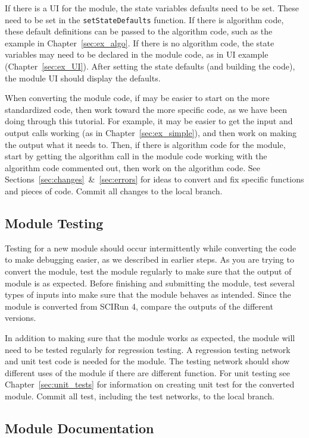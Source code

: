 \documentclass[fleqn,11pt,openany]{book}
\begin{document}
If there is a UI for the module, the state variables defaults need to be set.  
These need to be set in the \verb|setStateDefaults| function.
If there is algorithm code, these default definitions can be passed to the algorithm code, such as the example in Chapter~\ref{sec:ex_algo}.
If there is no algorithm code, the state variables may need to be declared in the module code, as in UI example (Chapter~\ref{sec:ex_UI}).
After setting the state defaults (and building the code), the module UI should display the defaults.

When converting the module code, if may be easier to start on the more standardized code, then work toward the more specific code, as we have been doing through this tutorial.  
For example, it may be easier to get the input and output calls working (as in Chapter~\ref{sec:ex_simple}), and then work on making the output what it needs to.  
Then, if there is algorithm code for the module, start by getting the algorithm call in the module code working with the algorithm code commented out, then work on the algorithm code.
See Sections~\ref{sec:changes}~\&~\ref{sec:errors} for ideas to convert and fix specific functions and pieces of code.  
Commit all changes to the local branch.

\subsection{Module Testing}

Testing for a new module should occur intermittently while converting the code to make debugging easier, as we described in earlier steps.  
As you are trying to convert the module, test the module regularly to make sure that the output of module is as expected.  
Before finishing and submitting the module, test several types of inputs into make sure that the module behaves as intended.  
Since the module is converted from SCIRun 4, compare the outputs of the different  versions.  

In addition to making sure that the module works as expected, the module will need to be tested regularly for regression testing.  
A regression testing network and unit test code is needed for the module.  
The testing network should show different uses of the module if there are different function. 
For unit testing see Chapter~\ref{sec:unit_tests} for information on creating unit test for the converted module.  
Commit all test, including the test networks, to the local branch.

\subsection{Module Documentation}
\end{document}
